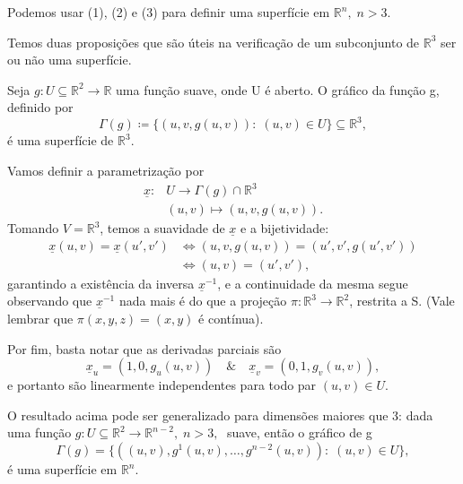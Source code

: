 \documentclass[../differential_geometry.tex]{subfiles}
\begin{document}
\begin{tcolorbox}[
		skin=enhanced,
		title=Observação,
		fonttitle=\bfseries,
		colframe=black,
		colbacktitle=cyan!75!white,
		colback=cyan!15,
		colbacklower=black,
		coltitle=black,
		drop fuzzy shadow,
	]
	Podemos usar (1), (2) e (3) para definir uma superfície em \(\mathbb{R}^{n},\; n > 3\).
\end{tcolorbox}
Temos duas proposições que são úteis na verificação de um subconjunto de \(\mathbb{R}^{3}\) ser ou não uma superfície.

\begin{prop*}
	Seja \(g:U\subseteq \mathbb{R}^{2}\rightarrow \mathbb{R}\) uma função suave, onde U é aberto. O gráfico da função g, definido por
	\[
		\Gamma (g)\coloneqq \{(u, v, g(u, v)):\; (u, v)\in U\}\subseteq \mathbb{R}^{3},
	\]
	é uma superfície de \(\mathbb{R}^{3}\).
\end{prop*}
\begin{proof*}
	Vamos definir a parametrização por
	\begin{align*}
		\underline{x}: & U\rightarrow\Gamma (g)\cap \mathbb{R}^{3} \\
		               & (u, v)\longmapsto (u, v, g(u, v)).
	\end{align*}
	Tomando \(V = \mathbb{R}^{3}\), temos a suavidade de \(\underline{x}\) e a bijetividade:
	\begin{align*}
		\underline{x}(u, v)= \underline{x}(u', v') & \Longleftrightarrow (u, v, g(u, v))=(u', v', g(u', v')) \\
		                                           & \Longleftrightarrow (u, v)=(u', v'),
	\end{align*}
	garantindo a existência da inversa \(\underline{x}^{-1}\), e a continuidade da mesma segue observando que \(\underline{x}^{-1}\) nada mais é do que a projeção \( \pi : \mathbb{R}^{3}\rightarrow \mathbb{R}^{2}\), restrita a S. (Vale lembrar que \( \pi (x, y, z)=(x,y)\) é contínua).

	Por fim, basta notar que as derivadas parciais são
	\[
		\underline{x}_{u}=(1,0, g_{u}(u, v)) \quad\&\quad \underline{x}_{v}=(0,1, g_{v}(u, v)),
	\]
	e portanto são linearmente independentes para todo par \((u, v)\in U\). \qedsymbol
\end{proof*}
\begin{tcolorbox}[
		skin=enhanced,
		title=Observação,
		fonttitle=\bfseries,
		colframe=black,
		colbacktitle=cyan!75!white,
		colback=cyan!15,
		colbacklower=black,
		coltitle=black,
		drop fuzzy shadow,
	]
	O resultado acima pode ser generalizado para dimensões maiores que 3: dada uma função \(g:U\subseteq \mathbb{R}^{2}\rightarrow \mathbb{R}^{n-2},\; n>3,\;\) suave, então o gráfico de g
	\[
		\Gamma (g)=\{((u, v), g^{1}(u, v), \dotsc , g^{n-2}(u, v)):\; (u, v)\in U\},
	\]
	é uma superfície em \(\mathbb{R}^{n}.\)
\end{tcolorbox}
\end{document}
